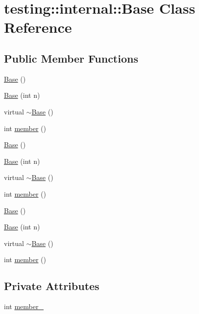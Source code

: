 \hypertarget{classtesting_1_1internal_1_1_base}{}\section{testing\+::internal\+::Base Class Reference}
\label{classtesting_1_1internal_1_1_base}
\subsection*{Public Member Functions}
\begin{DoxyCompactItemize}
\item 
\mbox{\hyperlink{classtesting_1_1internal_1_1_base_a6b29f1a7192b126e6fa0aae31200b5ca}{Base}} ()
\item 
\mbox{\hyperlink{classtesting_1_1internal_1_1_base_a255d105410a1eeb5f4690c9c8cd8e104}{Base}} (int n)
\item 
virtual \mbox{\hyperlink{classtesting_1_1internal_1_1_base_afb29c9032fb50cc6520014aad9d68328}{$\sim$\+Base}} ()
\item 
int \mbox{\hyperlink{classtesting_1_1internal_1_1_base_a7ddba6221b56613be545544b7ef6214c}{member}} ()
\item 
\mbox{\hyperlink{classtesting_1_1internal_1_1_base_a6b29f1a7192b126e6fa0aae31200b5ca}{Base}} ()
\item 
\mbox{\hyperlink{classtesting_1_1internal_1_1_base_a255d105410a1eeb5f4690c9c8cd8e104}{Base}} (int n)
\item 
virtual \mbox{\hyperlink{classtesting_1_1internal_1_1_base_afb29c9032fb50cc6520014aad9d68328}{$\sim$\+Base}} ()
\item 
int \mbox{\hyperlink{classtesting_1_1internal_1_1_base_a7ddba6221b56613be545544b7ef6214c}{member}} ()
\item 
\mbox{\hyperlink{classtesting_1_1internal_1_1_base_a6b29f1a7192b126e6fa0aae31200b5ca}{Base}} ()
\item 
\mbox{\hyperlink{classtesting_1_1internal_1_1_base_a255d105410a1eeb5f4690c9c8cd8e104}{Base}} (int n)
\item 
virtual \mbox{\hyperlink{classtesting_1_1internal_1_1_base_afb29c9032fb50cc6520014aad9d68328}{$\sim$\+Base}} ()
\item 
int \mbox{\hyperlink{classtesting_1_1internal_1_1_base_a7ddba6221b56613be545544b7ef6214c}{member}} ()
\end{DoxyCompactItemize}
\subsection*{Private Attributes}
\begin{DoxyCompactItemize}
\item 
int \mbox{\hyperlink{classtesting_1_1internal_1_1_base_ac085e9bc63731afa61028d3b5b401cd9}{member\+\_\+}}
\end{DoxyCompactItemize}


